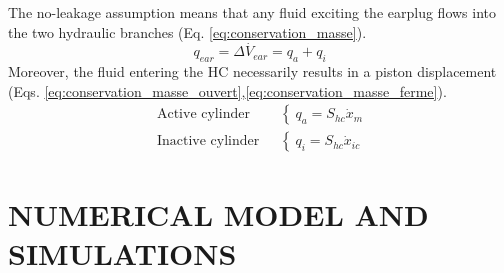 \documentclass[3p,twocolumn,preprint]{elsarticle}
\begin{document}
The no-leakage assumption means that any fluid exciting the earplug flows into the two hydraulic branches (Eq. \ref{eq:conservation_masse}).
\begin{equation}
	q_{ear} = \dot{\Delta V_{ear}} = q_a + q_i
	\label{eq:conservation_masse}
\end{equation}
Moreover, the fluid entering the HC necessarily results in a piston displacement (Eqs. \ref{eq:conservation_masse_ouvert},\ref{eq:conservation_masse_ferme}).
\begin{align}
	\text{Active cylinder ~}& \left\{~
	q_a = S_{hc} \dot{x}_m
	\right.
	\label{eq:conservation_masse_ouvert}\\
	\text{Inactive cylinder ~}& \left\{~
	q_i = S_{hc} \dot{x}_{ic}
	\right.
	\label{eq:conservation_masse_ferme}
\end{align}
\section{NUMERICAL MODEL AND SIMULATIONS}
\label{sec:NUMERICAL MODEL AND SIMULATIONS}
\end{document}
